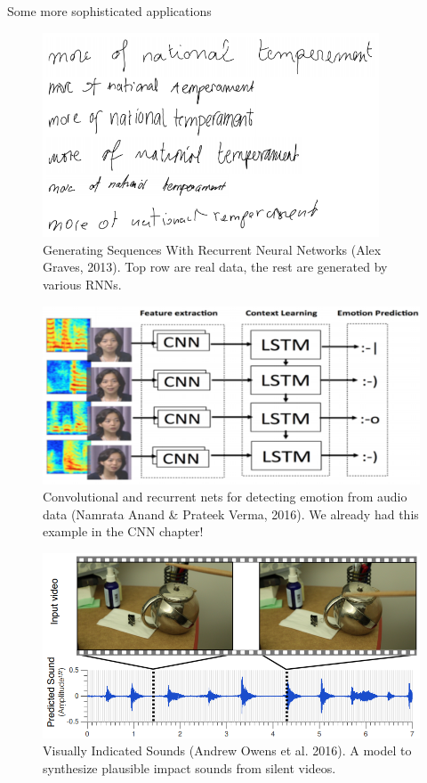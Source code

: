 \begin{vbframe}{Some more sophisticated applications}
  \begin{figure}
    \centering
    \includegraphics[width=10cm]{plots/hand_writing_generation.png}
    \caption{Generating Sequences With Recurrent Neural Networks (Alex Graves, 2013). Top row are real data, the rest are generated by various RNNs.}
  \end{figure}
\framebreak
  \begin{figure}
    \centering
    \includegraphics[width=11.5cm]{plots/emotion_from_audio_data.png}
    \caption{Convolutional and recurrent nets for detecting emotion from audio data (Namrata Anand \& Prateek Verma, 2016). We already had this example in the CNN chapter!}
  \end{figure}  
\framebreak
  \begin{figure}
    \centering
    \includegraphics[width=11.5cm]{plots/visually_indicated_sounds.png}
    \caption{Visually Indicated Sounds (Andrew Owens et al. 2016). A model to synthesize plausible impact sounds from silent videos.\href{https://www.youtube.com/watch?v=0FW99AQmMc8&feature=youtu.be&t=61}{}}
  \end{figure}   
\end{vbframe}

